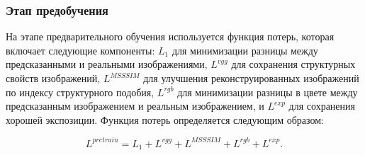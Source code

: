 \subsubsection{Этап предобучения}

На этапе предварительного обучения используется функция потерь, которая включает следующие компоненты: $L_1$ для минимизации разницы между предсказанными и реальными изображениями, $L^{vgg}$ для сохранения структурных свойств изображений, $L^{MSSSIM}$ для улучшения реконструированных изображений по индексу структурного подобия, $L^{rgb}$ для минимизации разницы в цвете между предсказанным изображением и реальным изображением, и $L^{exp}$ для сохранения хорошей экспозиции. Функция потерь определяется следующим образом:

\begin{equation}
    \label{eq:5-3-6}
    L^{pretrain} = L_1 + L^{vgg} + L^{MSSSIM} + L^{rgb} + L^{exp}.
\end{equation}

